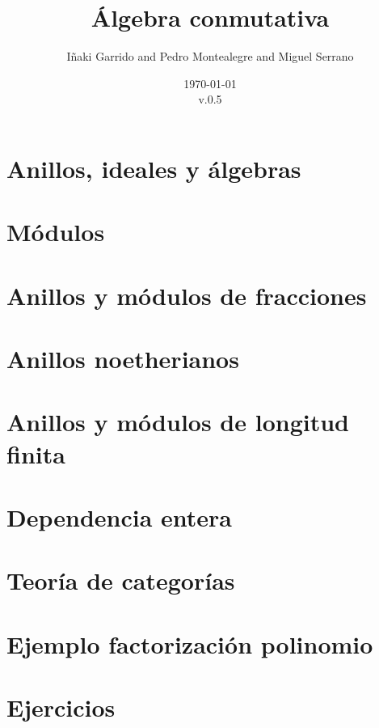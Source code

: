 \documentclass[a4paper,12pt]{book}
\title{Álgebra conmutativa}
\author{Iñaki Garrido and Pedro Montealegre and Miguel Serrano}
\date{\today \\ v.0.5}
\theoremstyle{definition}
\begin{document}
\maketitle
\tableofcontents
\chapter{Anillos, ideales y álgebras}

\chapter{Módulos}

\chapter{Anillos y módulos de fracciones}

\chapter{Anillos noetherianos}

\chapter{Anillos y módulos de longitud finita}

\chapter{Dependencia entera}



\appendix
\chapter{Teoría de categorías}

\chapter{Ejemplo factorización polinomio}

\chapter{Ejercicios}

\end{document}
